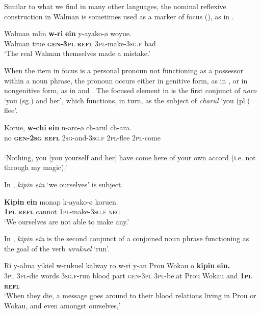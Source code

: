 \documentclass[output=paper]{langscibook}
\begin{document}
  Similar to what we find in many other languages, the nominal reflexive construction in Walman is sometimes used as a marker of focus (\citealt{Koenigetal2013}), as in .

\ea%
    \label{ex:Brown:63}
    \gll  Walman  mlin  \textbf{w-ri}  \textbf{ein}  y-ayako-ø  woyue.\\
 Walman  true  \textbf{\textsc{gen}}\textbf{{}-}\textbf{\textsc{3pl}}  \textbf{\textsc{refl}}  \textsc{3pl}{}-make-\textsc{3sg.f}  bad\\
    \glt ‘The real Walman themselves made a mistake.’
    \z

When the item in focus is a personal pronoun not functioning as a possessor within a noun phrase, the pronoun occurs either in genitive form, as in , or in nongenitive form, as in  and . The focused element in  is the first conjunct of \emph{naro} ‘you (sg.) and her’, which functions, in turn, as the subject of \emph{charul} ‘you (pl.) flee’. 

\ea%
    \label{ex:Brown:64}
    \gll   Korue,  \textbf{w-chi}  \textbf{ein}  n-aro-ø  ch-arul  ch-ara.\\
 no  \textbf{\textsc{gen}}\textbf{{}-}\textbf{\textsc{2sg}}  \textbf{\textsc{refl}}  \textsc{2sg}{}-and-\textsc{3sg.f}  \textsc{2pl}{}-flee  \textsc{2pl}{}-come\\
        \\
    \glt ‘Nothing, you [you yourself and her] have come here of your own accord (i.e. not through my magic).’
    \z

In , \emph{kipin} \emph{ein} ‘we ourselves’ is subject.


\ea%
    \label{ex:Brown:65}
    \gll \textbf{Kipin}  \textbf{ein}  monap  k-ayako-ø  koruen.\\
 \textbf{\textsc{1pl}}  \textbf{\textsc{refl}}  cannot  \textsc{1pl}{}-make-\textsc{3sg.f}  \textsc{neg}\\
    \glt ‘We ourselves are not able to make any.’
    \z

   
In , \emph{kipin} \emph{ein} is the second conjunct of a conjoined noun phrase functioning as the goal of the verb \emph{wrukuel} ‘run’.


\ea%
    \label{ex:Brown:66}
    \gll Ri  y-alma  yikiel  w-rukuel  kalway  ro  w-ri  y-an  Prou Wokau  o  \textbf{kipin}  \textbf{ein.}\\
 \textsc{3pl}  \textsc{3pl}{}-die  words  \textsc{3sg.f}{}-run  blood  part  \textsc{gen}{}-\textsc{3pl}  \textsc{3pl}{}-be.at  Prou Wokau  and  \textbf{\textsc{1pl}}  \textbf{\textsc{refl}}\\
    \glt ‘When they die, a message goes around to their blood relations living in Prou or Wokau, and even amongst ourselves,’
    \z
\end{document}
